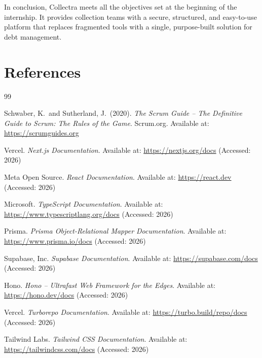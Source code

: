 \documentclass[12pt,a4paper]{report}
\begin{document}
In conclusion, Collectra meets all the objectives set at the beginning of the
internship.
It provides collection teams with a secure, structured, and easy-to-use platform
that replaces fragmented tools with a single, purpose-built solution for debt
management.

\chapter*{References}
{}

\begin{thebibliography}{99}

    Schwaber, K.\ and Sutherland, J.\ (2020).
    \textit{The Scrum Guide -- The Definitive Guide to Scrum: The Rules of the Game}.
    Scrum.org.
    Available at: \url{https://scrumguides.org}

    Vercel.
    \textit{Next.js Documentation}.
    Available at: \url{https://nextjs.org/docs}
    (Accessed: 2026)

    Meta Open Source.
    \textit{React Documentation}.
    Available at: \url{https://react.dev}
    (Accessed: 2026)

    Microsoft.
    \textit{TypeScript Documentation}.
    Available at: \url{https://www.typescriptlang.org/docs}
    (Accessed: 2026)

    Prisma.
    \textit{Prisma Object-Relational Mapper Documentation}.
    Available at: \url{https://www.prisma.io/docs}
    (Accessed: 2026)

    Supabase, Inc.
    \textit{Supabase Documentation}.
    Available at: \url{https://supabase.com/docs}
    (Accessed: 2026)

    Hono.
    \textit{Hono -- Ultrafast Web Framework for the Edges}.
    Available at: \url{https://hono.dev/docs}
    (Accessed: 2026)

    Vercel.
    \textit{Turborepo Documentation}.
    Available at: \url{https://turbo.build/repo/docs}
    (Accessed: 2026)

    Tailwind Labs.
    \textit{Tailwind CSS Documentation}.
    Available at: \url{https://tailwindcss.com/docs}
    (Accessed: 2026)


\end{thebibliography}
\end{document}
